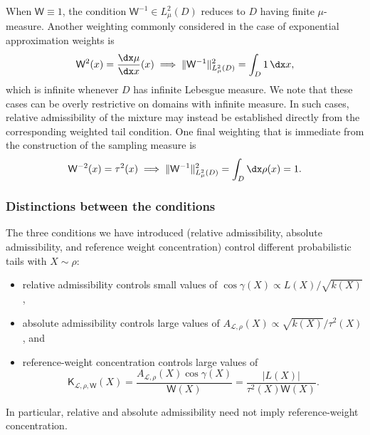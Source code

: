 \documentclass[10pt,dvipsnames]{amsart}
\begin{document}
\begin{remark}
When \(\mathsf W\equiv1\), the condition
\(\mathsf W^{-1}\in L^2_\mu(D)\) reduces to $D$ having finite $\mu$-measure. 
Another weighting commonly considered in the case of exponential approximation weights is
\[
    \mathsf W^2(x)
    =
    \frac{\dx\mu}{\dx x}(x)
\implies
    \|\mathsf W^{-1}\|_{L^2_\mu(D)}^2
    =
    \int_D 1\,\dx x,
\]
which is infinite whenever \(D\) has infinite Lebesgue measure. 
We note that these cases can be overly restrictive on domains with infinite measure. 
In such cases, relative admissibility of the
mixture may instead be established directly from the corresponding weighted
tail condition.
One final weighting that is immediate from the construction of the sampling measure is
\[
    \mathsf W^{-2}(x)
    =
    \tau^2(x)
\implies
    \|\mathsf W^{-1}\|_{L^2_\mu(D)}^2
    =
    \int_D \dx\rho(x) = 1.
\]
\end{remark}


\subsubsection{Distinctions between the conditions}
\label{sssec:admissibility-comparison}
The three conditions we have introduced (relative admissibility, absolute admissibility, and reference weight concentration) control different probabilistic tails with $X \sim \rho$:
\begin{itemize}
  \item relative admissibility controls small values of \(\cos\gamma(X) \propto L(X)/\sqrt{k(X)}\),
  \item absolute admissibility controls large values of \(A_{\mathcal L, \rho}(X) \propto \sqrt{k(X)}/\tau^2(X)\), and
  \item reference-weight concentration controls large values of
  \[
      \mathsf K_{\mathcal L,\rho,\mathsf W}(X)
      =
      \frac{
          A_{\mathcal L,\rho}(X)\cos\gamma(X)
      }{\mathsf W(X)}
      =
      \frac{|L(X)|}
      {\tau^2(X)\mathsf W(X)}.
  \]
\end{itemize}
In particular, relative and absolute admissibility need not imply
reference-weight concentration.
\end{document}
